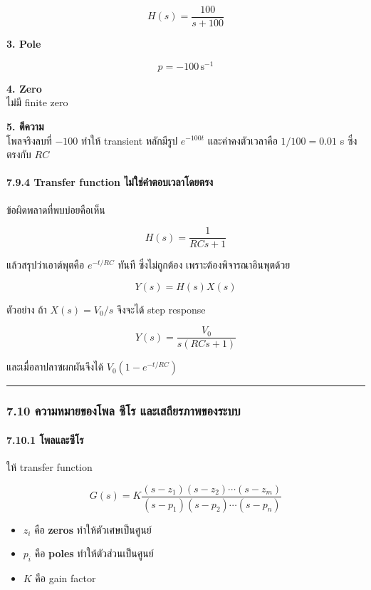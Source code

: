 \[
\boxed{H(s)=\frac{100}{s+100}}
\]

\textbf{3. Pole}

\[
\boxed{p=-100\,\text{s}^{-1}}
\]

\textbf{4. Zero}\\
ไม่มี finite zero

\textbf{5. ตีความ}\\
โพลจริงลบที่ $-100$ ทำให้ transient หลักมีรูป $e^{-100t}$ และค่าคงตัวเวลาคือ $1/100=0.01$ s ซึ่งตรงกับ $RC$

\paragraph{7.9.4 Transfer function ไม่ใช่คำตอบเวลาโดยตรง}

ข้อผิดพลาดที่พบบ่อยคือเห็น

\[
H(s)=\frac{1}{RCs+1}
\]

แล้วสรุปว่าเอาต์พุตคือ $e^{-t/RC}$ ทันที ซึ่งไม่ถูกต้อง เพราะต้องพิจารณาอินพุตด้วย

\[
Y(s)=H(s)X(s)
\]

ตัวอย่าง ถ้า $X(s)=V_0/s$ จึงจะได้ step response

\[
Y(s)=\frac{V_0}{s(RCs+1)}
\]

และเมื่อลาปลาซผกผันจึงได้ $V_0(1-e^{-t/RC})$

\par\noindent\rule{\textwidth}{0.4pt}\par

\subsubsection{7.10 ความหมายของโพล ซีโร และเสถียรภาพของระบบ}

\paragraph{7.10.1 โพลและซีโร}

ให้ transfer function

\[
G(s)=K\frac{(s-z_1)(s-z_2)\cdots(s-z_m)}{(s-p_1)(s-p_2)\cdots(s-p_n)}
\]

\begin{itemize}
    \item $z_i$ คือ \textbf{zeros} ทำให้ตัวเศษเป็นศูนย์
    \item $p_i$ คือ \textbf{poles} ทำให้ตัวส่วนเป็นศูนย์
    \item $K$ คือ gain factor
\end{itemize}


